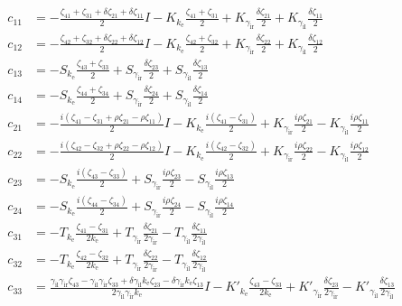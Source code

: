 \begin{align*}
  c_{11} &= -\frac{\zeta_{41}+\zeta_{31}+\delta \zeta_{21}+\delta \zeta_{11}}{2} I-K_{k_\text{e}} \frac{\zeta_{41}+\zeta_{31}}{2}+ K_{\gamma_\text{ir}} \frac{\delta\zeta_{21}}{2}+ K_{\gamma_\text{il}} \frac{\delta\zeta_{11}}{2} \\
  c_{12} &= -\frac{\zeta_{42}+\zeta_{32}+\delta \zeta_{22}+\delta \zeta_{12}}{2} I-K_{k_\text{e}} \frac{\zeta_{42}+\zeta_{32}}{2}+K_{\gamma_\text{ir}} \frac{\delta\zeta_{22}}{2}+K_{\gamma_\text{il}} \frac{\delta\zeta_{12}}{2} \\
  c_{13} &= -S_{k_\text{e}} \frac{\zeta_{43}+\zeta_{33}}{2}+S_{\gamma_\text{ir}} \frac{\delta \zeta_{23}}{2}+S_{\gamma_\text{il}} \frac{\delta \zeta_{13}}{2} \\
  c_{14} &= -S_{k_\text{e}} \frac{\zeta_{44}+\zeta_{34}}{2}+S_{\gamma_\text{ir}} \frac{\delta \zeta_{24}}{2}+S_{\gamma_\text{il}} \frac{\delta \zeta_{14}}{2} \\
  c_{21} &= -\frac{i (\zeta_{41}- \zeta_{31}+ \rho \zeta_{21}- \rho \zeta_{11})}{2} I-K_{k_\text{e}} \frac{i(\zeta_{41}- \zeta_{31})}{2}+K_{\gamma_\text{ir}} \frac{i \rho \zeta_{21}}{2}-K_{\gamma_\text{il}} \frac{i \rho \zeta_{11}}{2} \\
  c_{22} &= -\frac{i(\zeta_{42}- \zeta_{32}+ \rho \zeta_{22}- \rho \zeta_{12})}{2} I-K_{k_\text{e}} \frac{i(\zeta_{42}- \zeta_{32})}{2}+K_{\gamma_\text{ir}} \frac{i \rho \zeta_{22}}{2}-K_{\gamma_\text{il}} \frac{i\rho \zeta_{12}}{2} \\
  c_{23} &= -S_{k_\text{e}} \frac{i(\zeta_{43}-\zeta_{33})}{2}+ S_{\gamma_\text{ir}} \frac{i \rho\zeta_{23}}{2}-S_{\gamma_\text{il}} \frac{i \rho\zeta_{13}}{2} \\
  c_{24} &= -S_{k_\text{e}} \frac{i(\zeta_{44}- \zeta_{34})}{2}+S_{\gamma_\text{ir}} \frac{i \rho \zeta_{24}}{2}-S_{\gamma_\text{il}} \frac{i \rho \zeta_{14}}{2} \\
  c_{31} &= -T_{k_\text{e}} \frac{\zeta_{41}-\zeta_{31}}{2 k_\text{e}}+T_{\gamma_\text{ir}} \frac{\delta\zeta_{21}}{2 \gamma_\text{ir}}-T_{\gamma_\text{il}} \frac{\delta \zeta_{11}}{2 \gamma_\text{il}} \\
  c_{32} &= -T_{k_\text{e}} \frac{\zeta_{42}-\zeta_{32}}{2 k_\text{e}} + T_{\gamma_\text{ir}} \frac{\delta \zeta_{22}}{2 \gamma_\text{ir}}-T_{\gamma_\text{il}} \frac{\delta \zeta_{12}}{2 \gamma_\text{il}} \\
  c_{33} &= \frac{\gamma_\text{il} \gamma_\text{ir} \zeta_{43}-\gamma_\text{il} \gamma_\text{ir} \zeta_{33}+\delta \gamma_\text{il} k_\text{e} \zeta_{23}-\delta \gamma_\text{ir} k_\text{e} \zeta_{13}}{2 \gamma_\text{il} \gamma_\text{ir} k_\text{e}}I-K'_{k_\text{e}} \frac{\zeta_{43}-\zeta_{33}}{2 k_\text{e}}+K'_{\gamma_\text{ir}} \frac{\delta \zeta_{23}}{2 \gamma_\text{ir}}-K'_{\gamma_\text{il}} \frac{\delta \zeta_{13}}{2 \gamma_\text{il}} \\

\end{align*}
